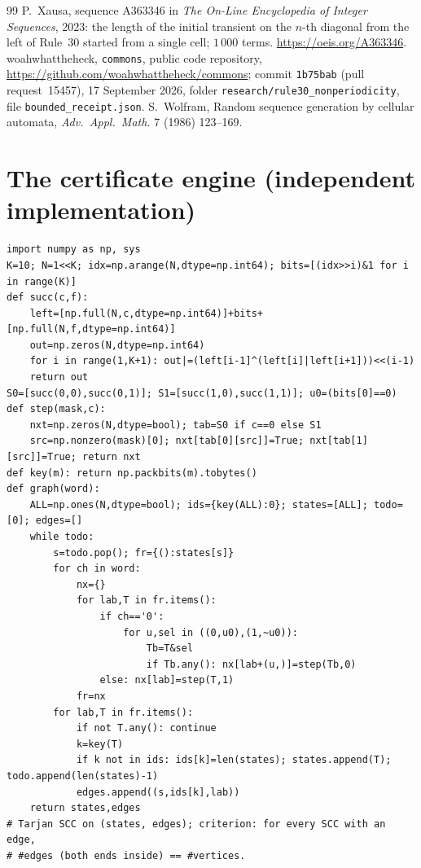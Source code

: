 \documentclass[11pt]{article}
\theoremstyle{definition}
\theoremstyle{remark}
\begin{document}
\begin{thebibliography}{99}
 P.~Xausa, sequence A363346 in \emph{The On-Line Encyclopedia of Integer Sequences}, 2023: the length of the initial transient on the $n$-th diagonal from the left of Rule~30 started from a single cell; $1\,000$ terms. \url{https://oeis.org/A363346}.
 woahwhattheheck, \texttt{commons}, public code repository, \url{https://github.com/woahwhattheheck/commons}; commit \texttt{1b75bab} (pull request~15457), 17 September 2026, folder \texttt{research/rule30\_nonperiodicity}, file \texttt{bounded\_receipt.json}.
 S.~Wolfram, Random sequence generation by cellular automata, \emph{Adv.\ Appl.\ Math.} 7 (1986) 123--169.
\end{thebibliography}

\appendix

\section{The certificate engine (independent implementation)}
\begin{footnotesize}
\begin{verbatim}
import numpy as np, sys
K=10; N=1<<K; idx=np.arange(N,dtype=np.int64); bits=[(idx>>i)&1 for i in range(K)]
def succ(c,f):
    left=[np.full(N,c,dtype=np.int64)]+bits+[np.full(N,f,dtype=np.int64)]
    out=np.zeros(N,dtype=np.int64)
    for i in range(1,K+1): out|=(left[i-1]^(left[i]|left[i+1]))<<(i-1)
    return out
S0=[succ(0,0),succ(0,1)]; S1=[succ(1,0),succ(1,1)]; u0=(bits[0]==0)
def step(mask,c):
    nxt=np.zeros(N,dtype=bool); tab=S0 if c==0 else S1
    src=np.nonzero(mask)[0]; nxt[tab[0][src]]=True; nxt[tab[1][src]]=True; return nxt
def key(m): return np.packbits(m).tobytes()
def graph(word):
    ALL=np.ones(N,dtype=bool); ids={key(ALL):0}; states=[ALL]; todo=[0]; edges=[]
    while todo:
        s=todo.pop(); fr={():states[s]}
        for ch in word:
            nx={}
            for lab,T in fr.items():
                if ch=='0':
                    for u,sel in ((0,u0),(1,~u0)):
                        Tb=T&sel
                        if Tb.any(): nx[lab+(u,)]=step(Tb,0)
                else: nx[lab]=step(T,1)
            fr=nx
        for lab,T in fr.items():
            if not T.any(): continue
            k=key(T)
            if k not in ids: ids[k]=len(states); states.append(T); todo.append(len(states)-1)
            edges.append((s,ids[k],lab))
    return states,edges
# Tarjan SCC on (states, edges); criterion: for every SCC with an edge,
# #edges (both ends inside) == #vertices.
\end{verbatim}
\end{footnotesize}
\end{document}
